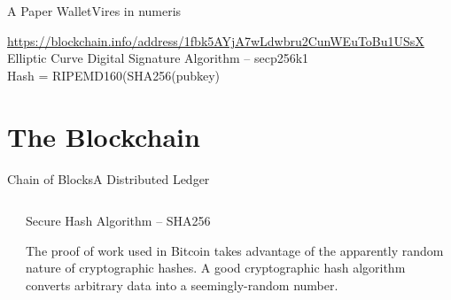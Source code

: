 \documentclass[english,compress]{beamer}
\begin{document}
\begin{frame}{A Paper Wallet}{Vires in numeris}
 \vfill
 \begin{tiny}
 \url{https://blockchain.info/address/1fbk5AYjA7wLdwbru2CunWEuToBu1USsX}
 \vfill
 \vfill
 Elliptic Curve Digital Signature Algorithm -- secp256k1 \\
 Hash = RIPEMD160(SHA256(pubkey)
\end{tiny}
\end{frame}

\section{The Blockchain}

\begin{frame}{Chain of Blocks}{A Distributed Ledger}
\begin{columns}
 \begin{column}{0.3 \textwidth}
 \end{column}
 \begin{column}{0.6 \textwidth}
 \begin{exampleblock}{\begin{scriptsize}Secure Hash Algorithm -- SHA256\end{scriptsize}}
  \begin{tiny}The proof of work used in Bitcoin takes advantage of the apparently random 
 nature of cryptographic hashes. A good cryptographic
 hash algorithm converts arbitrary data into a seemingly-random number.
 \end{tiny}
 \end{exampleblock}
 \end{column}
 \hfill
\end{columns}
\end{frame}
\end{document}
